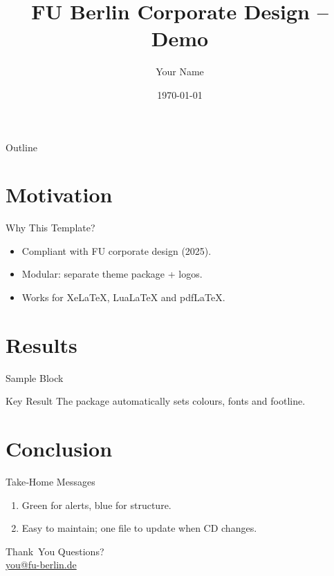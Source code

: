 \documentclass{beamer}
\title[Demo]{FU Berlin Corporate Design – Demo}
\author[Initials]{Your Name}
\date{\today}
\begin{document}
\begin{frame}[plain]
  \titlepage
\end{frame}

\begin{frame}{Outline}
  \tableofcontents
\end{frame}

\section{Motivation}
\begin{frame}{Why This Template?}
  \begin{itemize}
    \item Compliant with FU corporate design (2025).
    \item Modular: separate theme package + logos.
    \item Works for XeLaTeX, LuaLaTeX and pdfLaTeX.
  \end{itemize}
\end{frame}

\section{Results}
\begin{frame}{Sample Block}
  \begin{block}{Key Result}
    The package automatically sets colours, fonts and footline.
  \end{block}
\end{frame}

\section{Conclusion}
\begin{frame}{Take‑Home Messages}
  \begin{enumerate}
    \item Green for alerts, blue for structure.
    \item Easy to maintain; one file to update when CD changes.
  \end{enumerate}
\end{frame}

\begin{frame}{Thank You}
  \centering
  Questions?\\[1em]
  \href{mailto:you@fu-berlin.de}{you@fu-berlin.de}
\end{frame}
\end{document}
